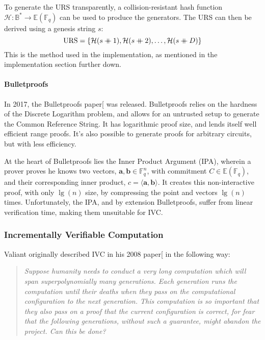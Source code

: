 \documentclass[
]{article}
\newcommand*\Bb{\mathbb{B}}
\newcommand*\Fb{\mathbb{F}}
\newcommand*\Eb{\mathbb{E}}
\newcommand*\Hc{\mathcal{H}}
\newcommand*\cat{\mathbin{+\mkern-10mu+}}
\renewcommand{\vec}[1]{ \boldsymbol{#1} }
\newcommand{\ip}[2]{ \langle #1, #2 \rangle }
\begin{document}
To generate the URS transparently, a collision-resistant hash function
\(\Hc : \Bb^* \to \Eb(\Fb_q)\) can be used to produce the generators.
The URS can then be derived using a genesis string \(s\):
\[\text{URS} = \{ \Hc(s \cat 1), \Hc(s \cat 2), \dots, \Hc(s \cat D) \}\]
This is the method used in the implementation, as mentioned in the
implementation section further down.

\paragraph{Bulletproofs}\label{bulletproofs}

In 2017, the Bulletproofs paper{[}\citeproc{ref-bulletproofs}{Bünz et
al. 2017}{]} was released. Bulletproofs relies on the hardness of the
Discrete Logarithm problem, and allows for an untrusted setup to
generate the Common Reference String. It has logarithmic proof size, and
lends itself well efficient range proofs. It's also possible to generate
proofs for arbitrary circuits, but with less efficiency.

At the heart of Bulletproofs lies the Inner Product Argument (IPA),
wherein a prover proves he knows two vectors,
\(\vec{a}, \vec{b} \in \Fb_q^n\), with commitment \(C \in \Eb(\Fb_q)\),
and their corresponding inner product, \(c = \ip{\vec{a}}{\vec{b}}\). It
creates this non-interactive proof, with only \(\lg(n)\) size, by
compressing the point and vectors \(\lg(n)\) times. Unfortunately, the
IPA, and by extension Bulletproofs, suffer from linear verification
time, making them unsuitable for IVC.

\subsubsection{Incrementally Verifiable
Computation}\label{incrementally-verifiable-computation}

Valiant originally described IVC in his 2008
paper{[}\citeproc{ref-valiant}{Valiant 2008}{]} in the following way:

\begin{quote}
\color{GbGrey}

\textit{Suppose humanity needs to conduct a very long computation which will span
superpolynomially many generations. Each generation runs the computation
until their deaths when they pass on the computational configuration to the
next generation. This computation is so important that they also pass on a
proof that the current configuration is correct, for fear that the following
generations, without such a guarantee, might abandon the project. Can this
be done?}

\end{quote}
\end{document}
